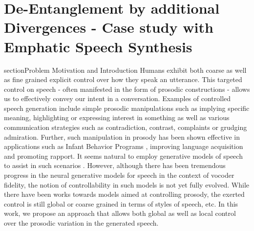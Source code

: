 \chapter{De-Entanglement by additional Divergences - Case study with Emphatic Speech Synthesis}


section{Problem Motivation and Introduction}
Humans exhibit both coarse as well as fine grained explicit control over how they speak an utterance. This targeted control on speech - often manifested in the form of prosodic constructions - allows us to effectively convey our intent in a conversation. Examples of controlled speech generation include simple prosodic manipulations such as implying specific meaning, highlighting or expressing interest in something as well as various communication strategies such as contradiction, contrast, complaints or grudging admiration\citep{nigel_ward_prosodic_patterns}. Further, such manipulation in prosody has been shown effective in
applications such as  Infant Behavior Programs \citep{parental_prosody_changes_mediate_infant_language_production}, improving language acquisition\citep{prosody_functionwords_acquisition} and promoting rapport\citep{rapport_dialogsystems}. It seems natural to employ generative models of speech\citep{tacotron_original,deepvoice2,clarinet,parrotron} to assist in such scenarios \citep{does_tts_help_comprehension}. However, although there has been tremendous progress in the neural generative models for speech in the context of vocoder fidelity\citep{waveglow,wavenet_original}, the notion of controllability in such models is not yet fully evolved. While there have been works towards models aimed at controlling prosody\citep{ tacotron_hierarchical,tacotron_stylefacoruncovering}, the exerted control is still global or coarse grained in terms of styles of speech\citep{tacotron_prosodycontrol,tacotron_styletokens}, etc. In this work, we propose an approach that allows both global as well as local control over the prosodic variation in the generated speech.    

